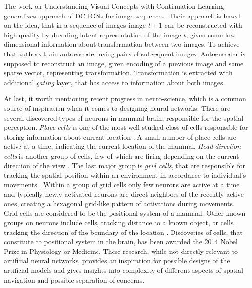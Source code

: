 The work on Understanding Visual Concepts with Continuation Learning \cite{Whitney2016} generalizes approach of DC-IGNs for image sequences.
Their approach is based on the idea, that in a sequence of images image $t+1$ can be reconstructed with high quality by decoding latent representation of the image $t$, given some low-dimensional information about transformation between two images.
To achieve that authors train autoencoder using pairs of subsequent images.
Autoencoder is supposed to reconstruct an image, given encoding of a previous image and some sparse vector, representing transformation.
Transformation is extracted with additional \textit{gating} layer, that has access to information about both images.

At last, it worth mentioning recent progress in neuro-science, which is a common source of inspiration when it comes to designing neural networks.
There are several discovered types of neurons in mammal brain, responsible for the spatial perception.
\textit{Place cells} is one of the most well-studied class of cells responsible for storing information about current location \cite{Fenton2009, Hartley2014}.
A small number of place cells are active at a time, indicating the current location of the mammal.
\textit{Head direction cells} is another group of cells, few of which are firing depending on the current direction of the view \cite{Taube1990, Taube1990a}.
The last major group is \textit{grid cells}, that are responsible for tracking the spatial position within an environment in accordance to individual's movements \cite{Moser2008}.
Within a group of grid cells only few neurons are active at a time and typically newly activated neurons are direct neighbors of the recently active ones, creating a hexagonal grid-like pattern of activations during movements.
Grid cells are considered to be the positional system of a mammal.
Other known groups on neurons include cells, tracking distance to a known object, or cells, tracking the direction of the boundary of the location \cite{Lever2009}.
Discoveries of cells, that constitute to positional system in the brain, has been awarded the 2014 Nobel Prize in Physiology or Medicine.
These research, while not directly relevant to artificial neural networks, provides an inspiration for possible designs of the artificial models and gives insights into complexity of different aspects of spatial navigation and possible separation of concerns.

